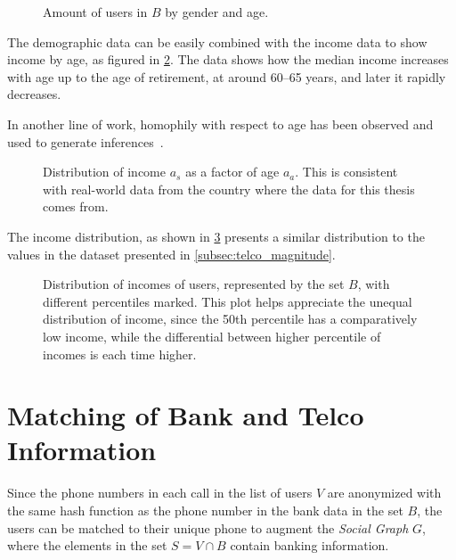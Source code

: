 \begin{figure}
\centering
{}
\caption{Amount of users in $B$ by gender and age.}
\label{fig:gender_age_bar}
\end{figure}

The demographic data can be easily combined with the income data to show income by age, as figured in \cref{fig:income_age_boxplot}. The data shows how the median income increases with age up to the age of retirement, at around 60--65 years, and later it rapidly decreases.

In another line of work, homophily with respect to age has been observed and used to generate inferences~\cite{brea2014}.

\begin{figure}
\centering
{}
\caption{Distribution of income $a_s$ as a factor of age $a_a$. This is consistent with real-world data from the country where the data for this thesis comes from.}
\label{fig:income_age_boxplot}
\end{figure}

The income distribution, as shown in \cref{fig:incomedistribution} presents a similar distribution to the values in the dataset presented in \cref{subsec:telco_magnitude}.

\begin{figure}
\centering
{}
\caption{Distribution of incomes of users, represented by the set $B$, with different percentiles marked. This plot helps appreciate the unequal distribution of income, since the 50th percentile has a comparatively low income, while the differential between higher percentile of incomes is each time higher.}
\label{fig:incomedistribution}
\end{figure}

\section{Matching of Bank and Telco Information}
\label{subsec:banktencomathing}

Since the phone numbers in each call in the list of users $V$ are anonymized with the same hash function as the phone number in the bank data in the set $B$, the users can be matched to their unique phone to augment the \emph{Social Graph} $G$, where the elements in the set $S = V \cap B$ contain banking information.

